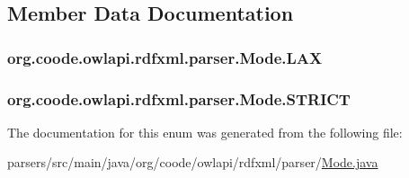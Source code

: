 \subsection{Member Data Documentation}
\hypertarget{enumorg_1_1coode_1_1owlapi_1_1rdfxml_1_1parser_1_1_mode_ab7b87a227b05c2b4ff7d449eaf95a06b}{
\subsubsection[{L\-A\-X}]{\setlength{\rightskip}{0pt plus 5cm}org.\-coode.\-owlapi.\-rdfxml.\-parser.\-Mode.\-L\-A\-X}}\label{enumorg_1_1coode_1_1owlapi_1_1rdfxml_1_1parser_1_1_mode_ab7b87a227b05c2b4ff7d449eaf95a06b}
\hypertarget{enumorg_1_1coode_1_1owlapi_1_1rdfxml_1_1parser_1_1_mode_a75df5b7dc7c6b9f85985801a3a4854e3}{
\subsubsection[{S\-T\-R\-I\-C\-T}]{\setlength{\rightskip}{0pt plus 5cm}org.\-coode.\-owlapi.\-rdfxml.\-parser.\-Mode.\-S\-T\-R\-I\-C\-T}}\label{enumorg_1_1coode_1_1owlapi_1_1rdfxml_1_1parser_1_1_mode_a75df5b7dc7c6b9f85985801a3a4854e3}


The documentation for this enum was generated from the following file\-:\begin{DoxyCompactItemize}
\item 
parsers/src/main/java/org/coode/owlapi/rdfxml/parser/\hyperlink{_mode_8java}{Mode.\-java}\end{DoxyCompactItemize}
